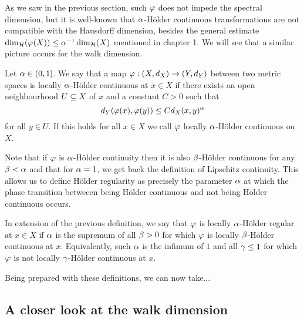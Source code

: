 As we saw in the previous section, such $\varphi$ does not impede the spectral dimension, but it is well-known that $\alpha$-H\"older continuous transformations are not compatible with the Hausdorff dimension, besides the general estimate $\dim_{\mathcal{H}}(\varphi(X))\leq\alpha^{-1}\dim_{\mathcal{H}}(X)$ mentioned in chapter 1. We will see that a similar picture occurs for the walk dimension.

\begin{defin}
  Let $\alpha\in(0,1]$. We say that a map $\varphi:(X,d_X)\to(Y,d_Y)$ between two metric spaces is locally $\alpha$-H\"older continuous at $x\in X$ if there exists an open neighbourhood $U\subseteq X$ of $x$ and a constant $C>0$ such that
  \[
    d_Y(\varphi(x),\varphi(y))\leq Cd_X(x,y)^\alpha
  \]
  for all $y\in U$. If this holds for all $x\in X$ we call $\varphi$ locally $\alpha$-H\"older continuous on $X$. 
\end{defin}
Note that if $\varphi$ is $\alpha$-H\"older continuity then it is also 
$\beta$-H\"older continuous for any $\beta<\alpha$ and that for $\alpha=1$, we get back the definition of Lipschitz continuity. This allows us to define H\"older regularity as precisely the parameter $\alpha$ at which the phase transition betweeen being H\"older continuous and not being H\"older continuous occurs.
\begin{defin}
  In extension of the previous definition, we say that $\varphi$ is 
  locally $\alpha$-H\"older regular at $x\in X$ if $\alpha$ is the supremum of all $\beta>0$ for which $\varphi$ is locally $\beta$-H\"older continuous at $x$. Equivalently, such $\alpha$ is the infimum of $1$ and all 
  $\gamma\leq1$ for which $\varphi$ is not locally $\gamma$-H\"older continuous at $x$. 
\end{defin}

Being prepared with these definitions, we can now take...

\subsection{A closer look at the walk dimension}

